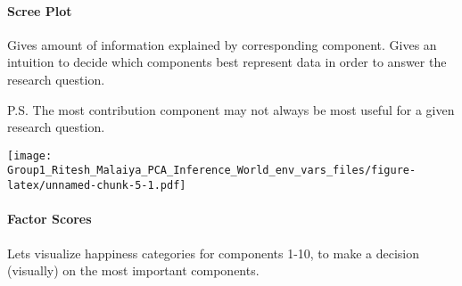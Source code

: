 \documentclass[]{article}
\newenvironment{Shaded}{\begin{snugshade}}{\end{snugshade}}
\newcommand{\DataTypeTok}[1]{\textcolor[rgb]{0.13,0.29,0.53}{#1}}
\newcommand{\KeywordTok}[1]{\textcolor[rgb]{0.13,0.29,0.53}{\textbf{#1}}}
\newcommand{\NormalTok}[1]{#1}
\newcommand{\OperatorTok}[1]{\textcolor[rgb]{0.81,0.36,0.00}{\textbf{#1}}}
\let\oldparagraph\paragraph
\renewcommand{\paragraph}[1]{\oldparagraph{#1}\mbox{}}
\begin{document}
\hypertarget{scree-plot}{%
\paragraph{Scree Plot}\label{scree-plot}}

Gives amount of information explained by corresponding component. Gives
an intuition to decide which components best represent data in order to
answer the research question.

P.S. The most contribution component may not always be most useful for a
given research question.

\begin{Shaded}
\end{Shaded}

\texttt{[image: Group1\_Ritesh\_Malaiya\_PCA\_Inference\_World\_env\_vars\_files/figure-latex/unnamed-chunk-5-1.pdf]}

\hypertarget{factor-scores}{%
\paragraph{Factor Scores}\label{factor-scores}}

Lets visualize happiness categories for components 1-10, to make a
decision (visually) on the most important components.
\end{document}
